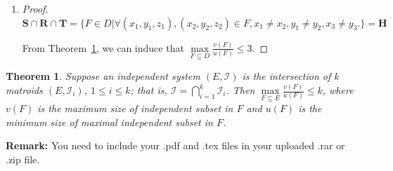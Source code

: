 \documentclass[12pt,a4paper]{article}
\makeatletter
\newtheorem{theorem}{Theorem}
\newtheorem*{solution}{Solution}
\theoremstyle{definition}
\renewenvironment{solution}[1][Solution] {\par\pushQED{\qed}\normalfont\topsep6\p@\@plus6\p@\relax\trivlist\item[\hskip\labelsep\bfseries#1\@addpunct{.}]\ignorespaces}{\popQED\endtrivlist\@endpefalse} \makeatother
\makeatother
\begin{document}
\begin{enumerate}
\begin{enumerate}
\begin{solution}
\begin{proof}
$\mathbf{S}\cap \mathbf{R} \cap \mathbf{T} = \{F\in D| \forall (x_1,y_1,z_1), (x_2,y_2,z_2) \in F, x_1\neq x_2, y_1\neq y_2, x_3\neq y_3.\} = \mathbf{H}$

From Theorem~\ref{Thm-Intersect}, we can induce that $\max\limits_{F \subseteq D} \frac{v(F)}{u(F)} \leq 3$.
	\end{proof}
			    
    	    \end{solution}
    \end{enumerate}
    \begin{theorem} \label{Thm-Intersect}
        Suppose an independent system $(E, \mathcal{I})$ is the intersection of $k$ matroids $\left(E, \mathcal{I}_{i}\right)$, $1 \leq i \leq k$; that is, $\mathcal{I}=\bigcap_{i=1}^{k} \mathcal{I}_{i}$. Then $\max\limits_{F \subseteq E} \frac{v(F)}{u(F)} \leq k$, where $v(F)$ is the maximum size of independent subset in $F$ and $u(F)$ is the minimum size of maximal independent subset in $F$.
    \end{theorem}    
\end{enumerate}

\vspace{20pt}

\textbf{Remark:} You need to include your .pdf and .tex files in your uploaded .rar or .zip file.

\end{document}
